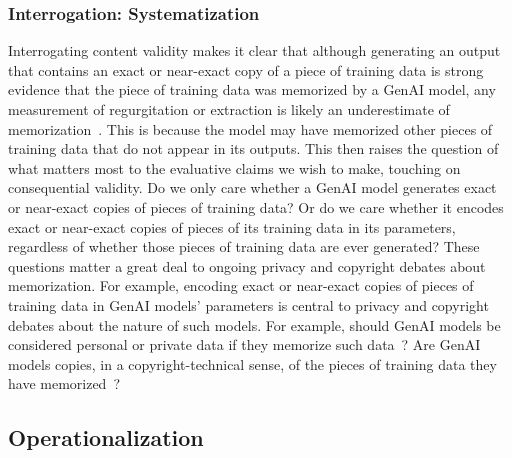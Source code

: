 \documentclass{article}
\begin{document}
\subsubsection{Interrogation: Systematization}

Interrogating content validity makes it clear that although generating an output that contains an exact or near-exact copy of a piece of training data is strong evidence that the piece of training data was memorized by a GenAI model, any measurement of regurgitation or extraction is likely an underestimate of memorization~\citep{
lee2022dedup, carlini2021extracting, 
nasr2023scalable,carlini2023quantifying}. This is because the model may have memorized other pieces of training data that do not appear in its outputs. This then raises the question of what matters most to the evaluative claims we wish to make, touching on consequential validity. Do we only care whether a GenAI model generates exact or near-exact copies of pieces of training data? Or do we care whether it encodes exact or near-exact copies of pieces of its training data in its parameters, regardless of whether those pieces of training data are ever generated? These questions matter a great deal to ongoing privacy and copyright debates about memorization. For example, encoding
exact or near-exact copies of pieces of training data in GenAI models' parameters is central to privacy and copyright debates about the nature of such models. For example, should GenAI models be considered personal or private data if they memorize such data~\citep{nolte2025personaldata, cooper2024unlearning}? Are GenAI 
models copies, in a copyright-technical sense, of the pieces of training data they have memorized~\citep{cooper2024files}?

\subsection{Operationalization}
\end{document}
